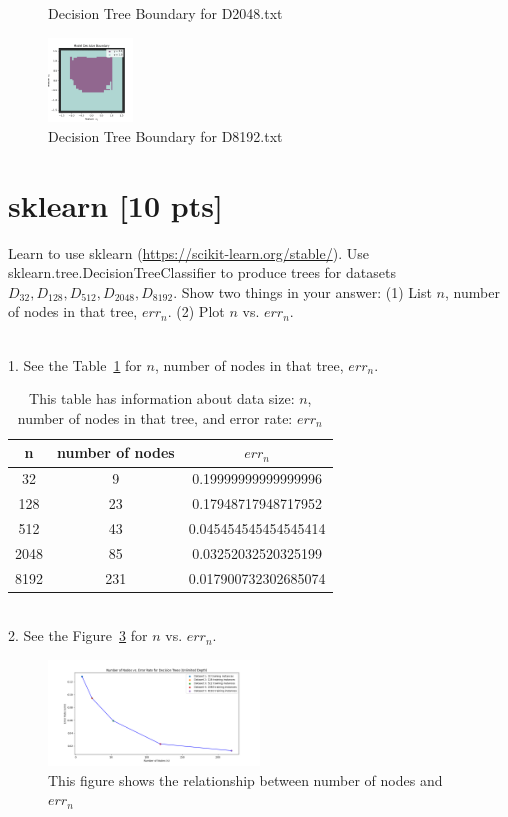 \documentclass[a4paper]{article}
\theoremstyle{definition}
\newenvironment{soln}{
    \leavevmode\color{blue}\ignorespaces
}{}
\begin{document}
\begin{enumerate}
\begin{soln}
\begin{figure}
      \caption{Decision Tree Boundary for D2048.txt}
      \label{fig:db2048}
    \end{figure}
    \begin{figure}
      \centering
      \includegraphics[width=0.2\textwidth]{./data/db8192.png}
      \caption{Decision Tree Boundary for D8192.txt}
      \label{fig:db8192}
    \end{figure}
  \end{soln}
\end{enumerate}

\section{sklearn [10 pts]}
Learn to use sklearn (\url{https://scikit-learn.org/stable/}).
Use sklearn.tree.DecisionTreeClassifier to produce trees for datasets $D_{32}, D_{128}, D_{512}, D_{2048}, D_{8192}$.  Show two things in your answer: (1) List $n$, number of nodes in that tree, $err_n$. (2) Plot $n$ vs. $err_n$.
\begin{soln}
  \\1. See the Table~\ref{tab:errnsk} for $n$, number of nodes in that tree, $err_n$.
  \begin{table}
    \centering
    \begin{tabular}{|c|c|c|}
      \hline
      n & number of nodes & $err_n$ \\
      \hline
      32 & 9 & 0.19999999999999996 \\
      \hline
      128 & 23 & 0.17948717948717952 \\
      \hline
      512 & 43 & 0.045454545454545414 \\
      \hline
      2048 & 85 & 0.03252032520325199 \\
      \hline
      8192 & 231 & 0.017900732302685074 \\
      \hline
    \end{tabular}
    \caption{This table has information about data size: $n$, number of nodes in that tree, and error rate: $err_n$}
    \label{tab:errnsk}
  \end{table}
  \\2. See the Figure~\ref{fig:errnsk} for $n$ vs. $err_n$.
  \begin{figure}
    \centering
    \includegraphics[width=0.5\textwidth]{./data/p3.png}
    \caption{This figure shows the relationship between number of nodes and $err_n$}
    \label{fig:errnsk}
  \end{figure}
\end{soln}
\end{document}
